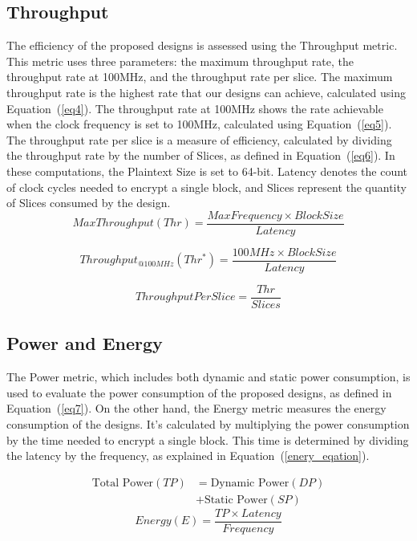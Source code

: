 \documentclass[final,5p,times,twocolumn]{elsarticle}
\begin{document}
\subsection{Throughput}\label{subsec6}
The efficiency of the proposed designs is assessed using the Throughput metric.
This metric uses three parameters: the maximum throughput rate, the throughput rate at 100MHz, and the throughput rate per slice.
The maximum throughput rate is the highest rate that our designs can achieve, calculated using Equation~(\ref{eq4}).
The throughput rate at 100MHz shows the rate achievable when the clock frequency is set to 100MHz, calculated using Equation~(\ref{eq5}).
The throughput rate per slice is a measure of efficiency, calculated by dividing the throughput rate by the number of Slices, as defined in Equation~(\ref{eq6}).
In these computations, the Plaintext Size is set to 64-bit.
Latency denotes the count of clock cycles needed to encrypt a single block, and Slices represent the quantity of Slices consumed by the design.
\begin{equation}
    MaxThroughput(Thr) = \frac{MaxFrequency \times Block Size}{Latency}
    \label{eq4}
\end{equation}

\begin{equation}
    Throughput_{@100MHz}(Thr^*) = \frac{100MHz \times Block Size}{Latency}
    \label{eq5}
\end{equation}

\begin{equation}
    ThroughputPerSlice = \frac{Thr}{Slices}
    \label{eq6}
\end{equation}

\subsection{Power and Energy}\label{power_energy}

The Power metric, which includes both dynamic and static power consumption, is used to evaluate the power consumption of the proposed designs, as defined in Equation~(\ref{eq7}).
On the other hand, the Energy metric measures the energy consumption of the designs. It's calculated by multiplying the power consumption by the time needed to encrypt a single block. This time is determined by dividing the latency by the frequency, as explained in Equation~(\ref{enery_eqation}).

\begin{align}
    \text{Total Power} (TP) & = \text{Dynamic Power} (DP) \nonumber \\
                            & + \text{Static Power} (SP)
    \label{eq7}
\end{align}
\begin{equation}
    Energy(E) = \frac{TP \times Latency }{Frequency}
    \label{enery_eqation}
\end{equation}
\end{document}

